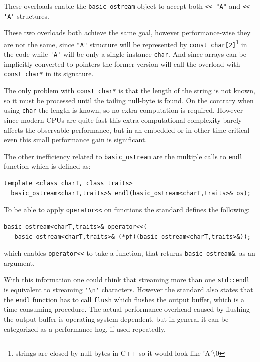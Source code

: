 These overloads enable the \verb|basic_ostream| object to accept both \verb|<< "A"| and \verb|<< 'A'| structures. \medskip
\par These two overloads both achieve the same goal, however performance-wise they are not the same, since \verb|"A"| structure will be represented by \verb|const char[2]|\footnote{strings are closed by null bytes in C++ so it would look like 'A'\textbackslash 0} in the code while \verb|'A'| will be only a single instance \verb|char|. And since arrays can be implicitly converted to pointers\cite[\S4.2]{cpp_standard} the former version will call the overload with \verb|const char*| in its signature.
\par The only problem with \verb|const char*| is that the length of the string is not known, so it must be processed until the tailing null-byte is found. On the contrary when using \verb|char| the length is known, so no extra computation is required. However since modern CPUs are quite fast this extra computational complexity barely affects the observable performance, but in an embedded or in other time-critical even this small performance gain is significant. \medskip
\par The other inefficiency related to \verb|basic_ostream| are the multiple calls to \verb|endl| function which is defined as\cite[\S27.7.3.8]{cpp_standard}:
\begin{verbatim}
template <class charT, class traits>
  basic_ostream<charT,traits>& endl(basic_ostream<charT,traits>& os);
\end{verbatim}
To be able to apply \verb|operator<<| on functions the standard defines the following\cite[\S27.7.3.6]{cpp_standard}: 
\begin{verbatim}
basic_ostream<charT,traits>& operator<<(
   basic_ostream<charT,traits>& (*pf)(basic_ostream<charT,traits>&));
\end{verbatim} 
which enables \verb|operator<<| to take a function, that returns \verb|basic_ostream&|, as an argument. \medbreak
\par With this information one could think that streaming more than one \verb|std::endl| is equivalent to streaming \verb|'\n'| characters. However the standard also states that the \verb|endl| function has to call \verb|flush|\cite[\S27.7.3.8]{cpp_standard} which flushes the output buffer, which is a time consuming procedure. The actual performance overhead caused by flushing the output buffer is operating system dependent, but in general it can be categorized as a performance hog, if used repeatedly. 
